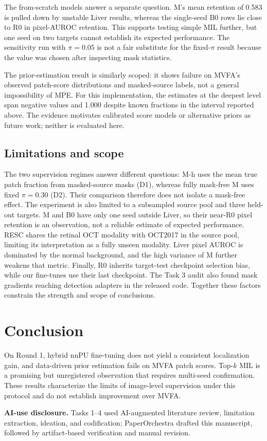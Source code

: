 \documentclass[10pt,twocolumn,letterpaper]{article}
\begin{document}
The from-scratch models answer a separate question. M's mean retention of 0.583 is pulled down by unstable Liver results, whereas the single-seed B0 rows lie close to R0 in pixel-AUROC retention. This supports testing simple MIL further, but one seed on two targets cannot establish its expected performance. The sensitivity run with $\pi=0.05$ is not a fair substitute for the fixed-$\pi$ result because the value was chosen after inspecting mask statistics.

The prior-estimation result is similarly scoped: it shows failure on MVFA's observed patch-score distributions and masked-source labels, not a general impossibility of MPE. For this implementation, the estimates at the deepest level span negative values and 1.000 despite known fractions in the interval reported above. The evidence motivates calibrated score models or alternative priors as future work; neither is evaluated here.

\subsection{Limitations and scope}
The two supervision regimes answer different questions: M-h uses the mean true patch fraction from masked-source masks (D1), whereas fully mask-free M uses fixed $\pi=0.30$ (D2). Their comparison therefore does not isolate a mask-free effect. The experiment is also limited to a subsampled source pool and three held-out targets. M and B0 have only one seed outside Liver, so their near-R0 pixel retention is an observation, not a reliable estimate of expected performance. RESC shares the retinal OCT modality with OCT2017 in the source pool, limiting its interpretation as a fully unseen modality. Liver pixel AUROC is dominated by the normal background, and the high variance of M further weakens that metric. Finally, R0 inherits target-test checkpoint selection bias, while our fine-tunes use their last checkpoint. The Task 3 audit also found mask gradients reaching detection adapters in the released code. Together these factors constrain the strength and scope of conclusions.

\section{Conclusion}
\label{sec:conclusion}
On Round 1, hybrid nnPU fine-tuning does not yield a consistent localization gain, and data-driven prior estimation fails on MVFA patch scores. Top-$k$ MIL is a promising but unregistered observation that requires multi-seed confirmation. These results characterize the limits of image-level supervision under this protocol and do not establish improvement over MVFA.

\noindent\textbf{AI-use disclosure.} Tasks 1--4 used AI-augmented literature review, limitation extraction, ideation, and codification; PaperOrchestra drafted this manuscript, followed by artifact-based verification and manual revision.

\clearpage
{\small


}
\end{document}
